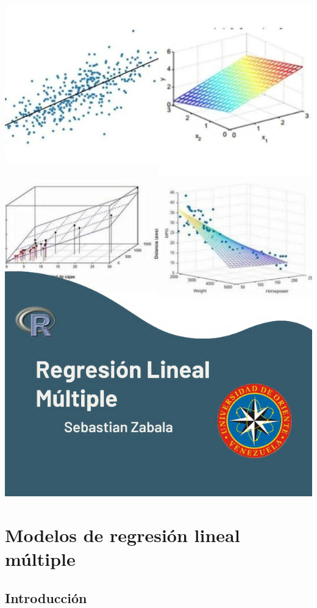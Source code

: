 \documentclass[
]{book}
\begin{document}
\begin{center}\includegraphics[width=9.79in]{imagen-2} \end{center}

\hypertarget{modelos-de-regresiuxf3n-lineal-muxfaltiple}{%
\chapter{Modelos de regresión lineal múltiple}\label{modelos-de-regresiuxf3n-lineal-muxfaltiple}}

\hypertarget{intro}{%
\section{Introducción}\label{intro}}
\end{document}
